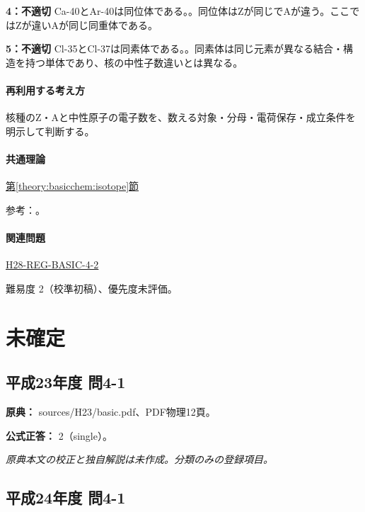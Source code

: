 \noindent\textbf{4：不適切} Ca-40とAr-40は同位体である。。同位体はZが同じでAが違う。ここではZが違いAが同じ同重体である。\par

\noindent\textbf{5：不適切} Cl-35とCl-37は同素体である。。同素体は同じ元素が異なる結合・構造を持つ単体であり、核の中性子数違いとは異なる。\par

\paragraph{再利用する考え方} 核種のZ・Aと中性原子の電子数を、数える対象・分母・電荷保存・成立条件を明示して判断する。

\paragraph{共通理論} \hyperref[theory:basicchem:isotope]{第\ref*{theory:basicchem:isotope}節}

\par 参考：\cite{iupac_isotopes}。

\paragraph{関連問題} \hyperref[q:h28-reg-basic-4-2]{H28-REG-BASIC-4-2}

\par 難易度 2（校準初稿）、優先度未評価。

\section{未確定}

\subsection{平成23年度 問4-1}
\label{q:h23-reg-basic-4-1}

\noindent\textbf{原典：} sources/H23/basic.pdf、PDF物理12頁。

\textbf{公式正答：} 2（single）。

\par\textit{原典本文の校正と独自解説は未作成。分類のみの登録項目。}

\subsection{平成24年度 問4-1}
\label{q:h24-reg-basic-4-1}

